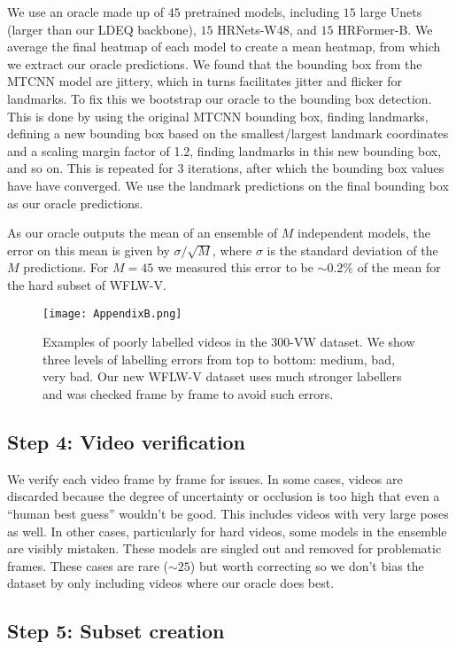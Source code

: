 \documentclass[10pt,twocolumn,letterpaper]{article}
\begin{document}
We use an oracle made up of $45$ pretrained models, including $15$ large Unets (larger than our LDEQ backbone), $15$ HRNets-W48, and $15$ HRFormer-B. We average the final heatmap of each model to create a mean heatmap, from which we extract our oracle predictions. We found that the bounding box from the MTCNN model are jittery, which in turns facilitates jitter and flicker for landmarks. To fix this we bootstrap our oracle to the bounding box detection. This is done by using the original MTCNN bounding box, finding landmarks, defining a new bounding box based on the smallest/largest landmark coordinates and a scaling margin factor of 1.2, finding landmarks in this new bounding box, and so on. This is repeated for 3 iterations, after which the bounding box values have have converged. We use the landmark predictions on the final bounding box as our oracle predictions. 

As our oracle outputs the mean of an ensemble of $M$ independent models, the error on this mean is given by $\sigma/\sqrt{M}$, where $\sigma$ is the standard deviation of the $M$ predictions. For $M=45$ we measured this error to be $\sim 0.2\%$ of the mean for the hard subset of WFLW-V. 
\begin{figure*}[t!]
  \centering
   \texttt{[image: AppendixB.png]}
   \caption{Examples of poorly labelled videos in the 300-VW dataset. We show three levels of labelling errors from top to bottom: medium, bad, very bad. Our new WFLW-V dataset uses much stronger labellers and was checked frame by frame to avoid such errors.}
   \label{fig:examples of 300 VW errors}
\end{figure*}

\subsection*{Step 4: Video verification}

We verify each video frame by frame for issues. In some cases, videos are discarded because the degree of uncertainty or occlusion is too high that even a ``human best guess'' wouldn't be good. This includes videos with very large poses as well. In other cases, particularly for hard videos, some models in the ensemble are visibly mistaken. These models are singled out and removed for problematic frames. These cases are rare ($\sim 25$) but worth correcting so we don't bias the dataset by only including videos where our oracle does best. 

\subsection*{Step 5: Subset creation}
\end{document}
